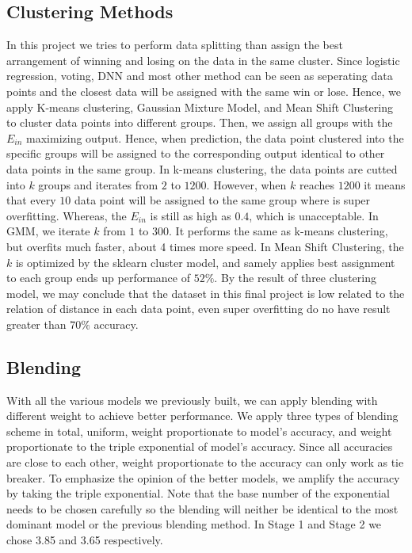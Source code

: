 \documentclass[11pt,a4paper]{article}
\begin{document}
\subsection{Clustering Methods}
In this project we tries to perform data splitting than assign the best arrangement of winning and losing on the data in the same cluster.
Since logistic regression, voting, DNN and most other method can be seen as seperating data points and the closest data will be assigned with the same win or lose.
Hence, we apply K-means clustering, Gaussian Mixture Model, and Mean Shift Clustering to cluster data points into different groups.
Then, we assign all groups with the $E_{in}$ maximizing output.
Hence, when prediction, the data point clustered into the specific groups will be assigned to the corresponding output identical to other data points in the same group.
In k-means clustering, the data points are cutted into $k$ groups and iterates from $2$ to $1200$.
However, when $k$ reaches $1200$ it means that every $10$ data point will be assigned to the same group where is super overfitting.
Whereas, the $E_{in}$ is still as high as $0.4$, which is unacceptable.
In GMM, we iterate $k$ from $1$ to $300$.
It performs the same as k-means clustering, but overfits much faster, about 4 times more speed.
In Mean Shift Clustering, the $k$ is optimized by the sklearn cluster model, and samely applies best assignment to each group ends up performance of $52\%$.
By the result of three clustering model, we may conclude that the dataset in this final project is low related to the relation of distance in each data point, even super overfitting do no have result greater than $70\%$ accuracy.

\subsection{Blending}
With all the various models we previously built, we can apply blending with different weight to achieve better performance. 
We apply three types of blending scheme in total, uniform, weight proportionate to model's accuracy, and weight proportionate to the triple exponential of model's accuracy. 
Since all accuracies are close to each other, weight proportionate to the accuracy can only work as tie breaker. To emphasize the opinion of the better models, we amplify the accuracy by taking the triple exponential. 
Note that the base number of the exponential needs to be chosen carefully so the blending will neither be identical to the most dominant model or the previous blending method. In Stage 1 and Stage 2 we chose 3.85 and 3.65 respectively.
\end{document}
